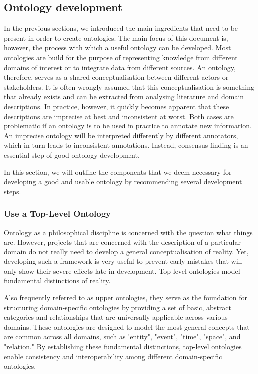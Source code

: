 


\subsection{Ontology development}

In the previous sections, we introduced the main ingredients that need to be present in order to create ontologies. The main focus of this document is, however, the process with which a useful ontology can be developed. Most ontologies are build for the purpose of representing knowledge from different domains of interest or to integrate data from different sources. An ontology, therefore, serves as a shared conceptualisation between different actors or stakeholders. It is often wrongly assumed that this conceptualisation is something that already exists and can be extracted from analysing literature and domain descriptions. In practice, however, it quickly becomes apparent that these descriptions are imprecise at best and inconsistent at worst. Both cases are problematic if an ontology is to be used in practice to annotate new information. An imprecise ontology will be interpreted differently by different annotators, which in turn leads to inconsistent annotations. Instead, consensus finding is an essential step of good ontology development.

In this section, we will outline the components that we deem necessary for developing a good and usable ontology by recommending several development steps.


\subsubsection{Use a Top-Level Ontology}

Ontology as a philosophical discipline is concerned with the question what things are. However, projects that are concerned with the description of a particular domain do not really need to develop a general conceptualisation of reality. Yet, developing such a framework is very useful to prevent early mistakes that will only show their severe effects late in development. Top-level ontologies model fundamental distinctions of reality. 

Also frequently referred to as upper ontologies, they serve as the foundation for structuring domain-specific ontologies by providing a set of basic, abstract categories and relationships that are universally applicable across various domains. These ontologies are designed to model the most general concepts that are common across all domains, such as "entity", "event", "time", "space", and "relation." By establishing these fundamental distinctions, top-level ontologies enable consistency and interoperability among different domain-specific ontologies.

